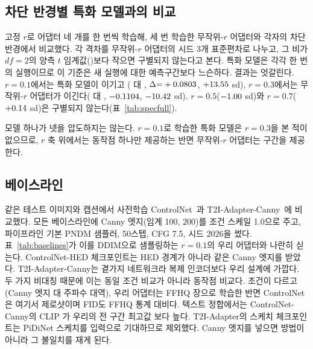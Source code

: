 \documentclass[10pt,twocolumn,a4paper]{article}
\begin{document}
\subsection{차단 반경별 특화 모델과의 비교}
\label{sec:spec}

고정 $r$로 어댑터 네 개를 한 번씩 학습해, 세 번 학습한 무작위-$r$ 어댑터와 각자의 차단
반경에서 비교했다. 각 격차를 무작위-$r$ 어댑터의 시드 3개 표준편차로 나누고, 그 비가 $df=2$의
양측 $t$ 임계값(\tailCrit{})보다 작으면 구별되지 않는다고 본다. 특화 모델은 각각 한 번의
실행이므로 이 기준은 새 실행에 대한 예측구간보다 느슨하다. 결과는 엇갈린다. $r{=}0.1$에서는 특화 모델이 이기고
(\specOneZero{} 대 \sMeanOneZero{}, $\Delta{=}+0.0803{}$, $+13.55{}$ sd),
$r{=}0.3$에서는 무작위-$r$ 어댑터가 이긴다(\sMeanThreeZero{} 대 \specThreeZero{},
$-0.1104{}$, $-10.42{}$ sd). $r{=}0.5$($-1.00{}$ sd)와
$r{=}0.7$($+0.14{}$ sd)은 구별되지 않는다(표~\ref{tab:specfull}).

모델 하나가 넷을 압도하지는 않는다. $r{=}0.1$로 학습한 특화 모델은 $r{=}0.3$을 본 적이
없으므로, $r$ 축 위에서는 동작점 하나만 제공하는 반면 무작위-$r$ 어댑터는 구간을 제공한다.

\subsection{베이스라인}

같은 테스트 이미지와 캡션에서 사전학습 ControlNet~\cite{zhang2023adding}과
T2I-Adapter-Canny~\cite{mou2023adapter}에 비교했다. 모든 베이스라인에 Canny 엣지(임계 100,
200)를 조건 스케일 1.0으로 주고, 파이프라인 기본 PNDM 샘플러, 50스텝, CFG 7.5, 시드 2026을
썼다. 표~\ref{tab:baselines}가 이를 DDIM으로 샘플링하는 $r{=}0.1$의 우리 어댑터와 나란히
싣는다. ControlNet-HED 체크포인트는 HED 경계가 아니라 같은 Canny 엣지를 받았다.
T2I-Adapter-Canny는 곁가지 네트워크라 복제 인코더보다 우리 설계에 가깝다. 두 가지 비대칭
때문에 이는 동일 조건 비교가 아니라 동작점 비교다. 조건이 다르고(Canny 엣지 대 주파수 대역),
우리 어댑터는 FFHQ \nTrain{}장으로 학습한 반면 ControlNet은 여기서 제로샷이며 FID도 FFHQ
통계 대비다. 텍스트 정합에서는 ControlNet-Canny의 CLIP \baseCannyClip{}가 우리의 전 구간
최고값 \clipMainOneHundred{}보다 높다. T2I-Adapter의 스케치 체크포인트는 PiDiNet 스케치를
입력으로 기대하므로 제외했다. Canny 엣지를 넣으면 방법이 아니라 그 불일치를 재게 된다.
\end{document}

